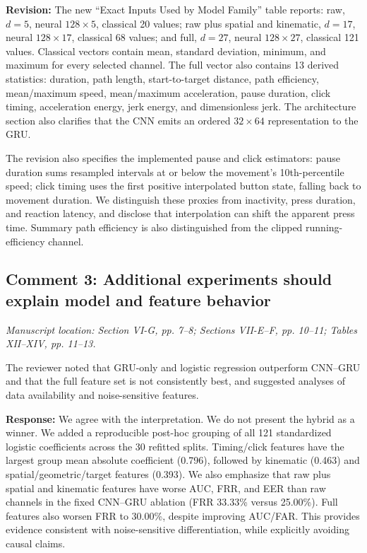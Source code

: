 \documentclass[11pt]{article}
\newcommand{\response}[1]{\par\noindent\textcolor{responseblue}{\textbf{Response:}} #1\par}
\newcommand{\change}[1]{\par\noindent\textcolor{responseblue}{\textbf{Revision:}} #1\par}
\newcommand{\location}[1]{\par\noindent\textit{Manuscript location: #1.}\par}
\begin{document}
\change{The new ``Exact Inputs Used by Model Family'' table reports: raw,
$d=5$, neural $128\times5$, classical 20 values; raw plus spatial and
kinematic, $d=17$, neural $128\times17$, classical 68 values; and full,
$d=27$, neural $128\times27$, classical 121 values. Classical vectors contain
mean, standard deviation, minimum, and maximum for every selected channel. The full vector
also contains 13 derived statistics: duration, path length, start-to-target
distance, path efficiency, mean/maximum speed, mean/maximum acceleration,
pause duration, click timing, acceleration energy, jerk energy, and
dimensionless jerk. The architecture section also clarifies that the CNN emits
an ordered $32\times64$ representation to the GRU.}

The revision also specifies the implemented pause and click estimators:
pause duration sums resampled intervals at or below the movement's
10th-percentile speed; click timing uses the first positive interpolated
button state, falling back to movement duration. We distinguish these proxies
from inactivity, press duration, and reaction latency, and disclose that
interpolation can shift the apparent press time. Summary path efficiency is
also distinguished from the clipped running-efficiency channel.

\subsection*{Comment 3: Additional experiments should explain model and feature behavior}
\location{Section VI-G, pp. 7--8; Sections VII-E--F, pp. 10--11; Tables XII--XIV, pp. 11--13}
The reviewer noted that GRU-only and logistic regression outperform CNN--GRU
and that the full feature set is not consistently best, and suggested analyses
of data availability and noise-sensitive features.

\response{We agree with the interpretation. We do not present the hybrid as a
winner. We added a reproducible post-hoc grouping of all 121 standardized
logistic coefficients across the 30 refitted splits. Timing/click features have
the largest group mean absolute coefficient (0.796), followed by kinematic
(0.463) and spatial/geometric/target features (0.393). We also emphasize that
raw plus spatial and kinematic features have worse AUC, FRR, and EER
than raw channels in the fixed CNN--GRU ablation (FRR 33.33\% versus 25.00\%).
Full features also worsen FRR to 30.00\%, despite improving AUC/FAR.
This provides evidence consistent with
noise-sensitive differentiation, while explicitly avoiding causal claims.}
\end{document}
